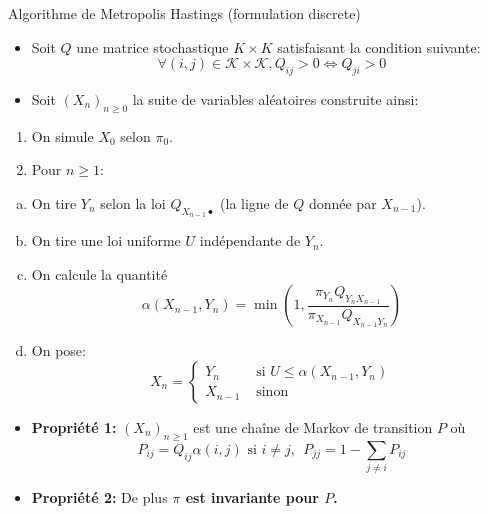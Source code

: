 \documentclass[9pt,ignorenonframetext,]{beamer}
\providecommand{\tightlist}{%
  \setlength{\itemsep}{0pt}\setlength{\parskip}{0pt}}
\newcommand{\K}{\mathcal{K}}
\begin{document}
\begin{frame}{Algorithme de Metropolis Hastings (formulation discrete)}
\protect\hypertarget{algorithme-de-metropolis-hastings-formulation-discrete}{}

\begin{itemize}
\tightlist
\item
  Soit \(Q\) une matrice stochastique \(K \times K\) satisfaisant la
  condition suivante:
  \[\forall (i, j) \in \K\times \K, Q_{ij} > 0 \Leftrightarrow Q_{ji} > 0\]
\item
  Soit \((X_n)_{n\geq 0}\) la suite de variables aléatoires construite
  ainsi:\pause
\end{itemize}

\begin{enumerate}
\tightlist
\item
  On simule \(X_0\) selon \(\pi_0\).\pause
\item
  Pour \(n\geq 1\):
\end{enumerate}

\begin{enumerate}
[a.]
\tightlist
\item
  On tire \(Y_n\) selon la loi \(Q_{X_{n-1}\bullet}\) (la ligne de \(Q\)
  donnée par \(X_{n-1}\)).\pause
\item
  On tire une loi uniforme \(U\) indépendante de \(Y_n\).\pause
\item
  On calcule la quantité
  \[\alpha(X_{n-1}, Y_n) = \min\left(1, \frac{\pi_{Y_n}Q_{Y_n X_{n-1}}}{\pi_{X_{n - 1}}Q_{X_{n-1}Y_n}}\right)\]
  \pause
\item
  On pose: \[X_n = \left\lbrace
  \begin{array}{lr}
  Y_n & \text{ si } U\leq\alpha(X_{n-1}, Y_n)\\
  X_{n - 1} &\text{ sinon}
  \end{array}
   \right.\]\pause
\end{enumerate}

\begin{itemize}
\tightlist
\item
  \textbf{Propriété 1:} \((X_n)_{n \geq 1}\) est une chaîne de Markov de
  transition \(P\) où
  \[P_{ij} = Q_{ij}\alpha(i, j)  \text{ si } i\neq j,~~ P_{jj} = 1 - \sum_{j\neq i} P_{ij}\]
\item
  \textbf{Propriété 2:} De plus \textbf{\(\pi\) est invariante pour
  \(P\).}
\end{itemize}

\end{frame}
\end{document}
